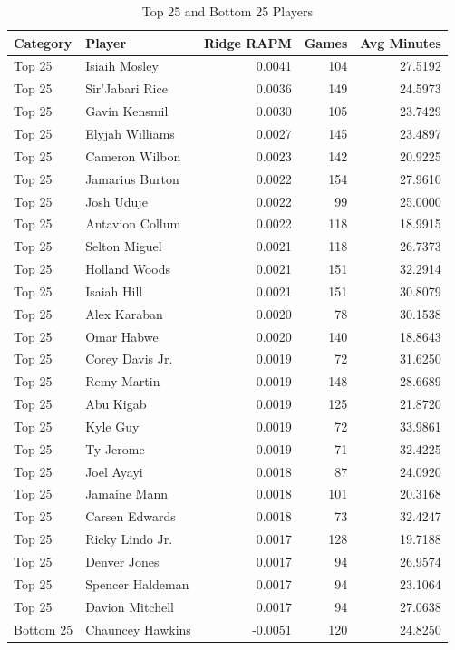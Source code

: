 \documentclass[
  letterpaper,
  DIV=11,
  numbers=noendperiod]{scrartcl}
\begin{document}
\begin{longtable}[t]{llrrr}
\caption{\label{tab:top-bottom-table}Top 25 and Bottom 25 Players}\\
\toprule
Category & Player & Ridge RAPM & Games & Avg Minutes\\
\midrule
Top 25 & Isiaih Mosley & 0.0041 & 104 & 27.5192\\
Top 25 & Sir'Jabari Rice & 0.0036 & 149 & 24.5973\\
Top 25 & Gavin Kensmil & 0.0030 & 105 & 23.7429\\
Top 25 & Elyjah Williams & 0.0027 & 145 & 23.4897\\
Top 25 & Cameron Wilbon & 0.0023 & 142 & 20.9225\\
\addlinespace
Top 25 & Jamarius Burton & 0.0022 & 154 & 27.9610\\
Top 25 & Josh Uduje & 0.0022 & 99 & 25.0000\\
Top 25 & Antavion Collum & 0.0022 & 118 & 18.9915\\
Top 25 & Selton Miguel & 0.0021 & 118 & 26.7373\\
Top 25 & Holland Woods & 0.0021 & 151 & 32.2914\\
\addlinespace
Top 25 & Isaiah Hill & 0.0021 & 151 & 30.8079\\
Top 25 & Alex Karaban & 0.0020 & 78 & 30.1538\\
Top 25 & Omar Habwe & 0.0020 & 140 & 18.8643\\
Top 25 & Corey Davis Jr. & 0.0019 & 72 & 31.6250\\
Top 25 & Remy Martin & 0.0019 & 148 & 28.6689\\
\addlinespace
Top 25 & Abu Kigab & 0.0019 & 125 & 21.8720\\
Top 25 & Kyle Guy & 0.0019 & 72 & 33.9861\\
Top 25 & Ty Jerome & 0.0019 & 71 & 32.4225\\
Top 25 & Joel Ayayi & 0.0018 & 87 & 24.0920\\
Top 25 & Jamaine Mann & 0.0018 & 101 & 20.3168\\
\addlinespace
Top 25 & Carsen Edwards & 0.0018 & 73 & 32.4247\\
Top 25 & Ricky Lindo Jr. & 0.0017 & 128 & 19.7188\\
Top 25 & Denver Jones & 0.0017 & 94 & 26.9574\\
Top 25 & Spencer Haldeman & 0.0017 & 94 & 23.1064\\
Top 25 & Davion Mitchell & 0.0017 & 94 & 27.0638\\
\addlinespace
Bottom 25 & Chauncey Hawkins & -0.0051 & 120 & 24.8250\\

\end{longtable}
\end{document}
